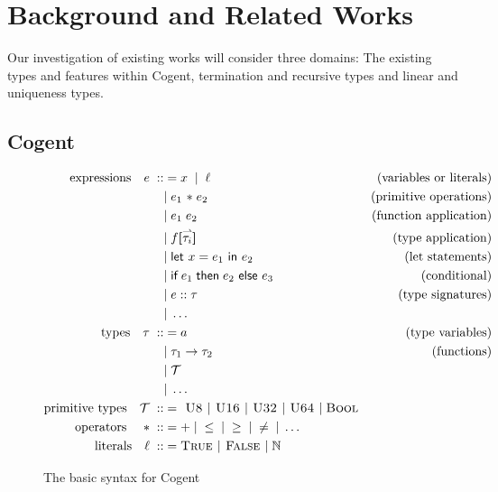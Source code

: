 \chapter{Background and Related Works}\label{ch:background}

Our investigation of existing works will consider three domains: The existing types and features
within Cogent, termination and recursive types and linear and uniqueness types.

\section{Cogent}
\begin{figure}
    \centering

    \begin{align*}
    \text{expressions}\quad e\; ::&= x\;\; |\;\; \ell & \text{(variables or literals)} \\
                &|\; e_1 \text{ \textasteriskcentered }\; e_2 & \text{(primitive operations)} \\
                &|\; e_1\; e_2 & \text{(function application)} \\
                &|\; f\textbf{[}\harpoon{\tau_i}\textbf{]} & \text{(type application)} \\
                &|\; \textsf{let } x = e_1 \textsf{ in } e_2 & \text{(let statements)} \\
                &|\; \textsf{if}\; e_1\; \textsf{then}\; e_2 \textsf{ else } e_3 & \text{(conditional)} \\
                &|\; e :: \tau & \text{(type signatures)} \\
                &|\; \dots \\
        \text{types}\quad \tau\; ::&= a & \text{(type variables)} \\
              &|\; \tau_1 \rightarrow \tau_2 & \text{(functions)} \\
              &|\; \mathcal{T} \\
              &|\; \dots \\
        \text{primitive types}\quad \mathcal{T}\; ::&= \textsc{ U8 } | \textsc{ U16 } | \textsc{ U32 } | \textsc{ U64 } |\; \textsc{Bool} \\
        \text{operators \ \ \ \textasteriskcentered }\; ::&= +\; |\; \leq\; |\; \geq\; |\; \neq\; |\; \dots \\
        \text{literals}\quad \ell\; ::&= \textsc{True } | \textsc{ False } |\; \mathbb{N}  \\
    \end{align*}

    \caption{The basic syntax for Cogent~\citep{LiamThesis}}
    \label{fig:cogentGrammar}
\end{figure}


